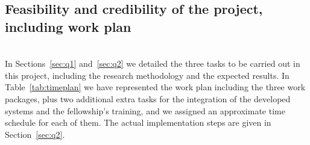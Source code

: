\subsection{Feasibility and credibility of the project, including work plan} 
\\
In Sections~\ref{sec:q1} and~\ref{sec:q2} we detailed the three tasks to be carried 
out in this project, including the research methodology and the expected results. 
In Table~\ref{tab:timeplan} we have represented the work plan including the three 
work packages, plus two additional extra tasks for the integration of the developed systems
and the fellowship's training, and we assigned an approximate time schedule for each of them.
The actual implementation steps are given in Section~\ref{sec:q2}.
\begin{table}[h!]
  \begin{Timeplan}
    \hline
    \hline
    \hline
    
    \hline
    \hline
    \hline
    \hline
    
    \hline
    \hline
    \hline
    \hline
    

\end{Timeplan}
\end{table}
